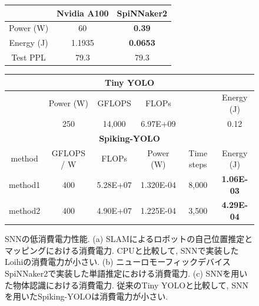 \begin{figure}[htb]
    \centering

    \begin{minipage}{0.3\textwidth}
        \centering
        
        \label{fig:snnslam}
    \end{minipage}
    \hspace{0.02\textwidth}
    \begin{minipage}{0.6\textwidth}
        \centering
        \begin{tabular}{ccc}
            \hline
            & Nvidia A100 & SpiNNaker2 \\ 
            \hline
            Power (W) & 60 & \textbf{0.39} \\
            Energy (J) & 1.1935 & \textbf{0.0653} \\
            Test PPL & 79.3 & 79.3 \\
            \hline
        \end{tabular}
        \label{tab:spinnaker}
    \end{minipage}


    \begin{minipage}{1.0\textwidth}
        \centering
        \begin{tabular}{cccccc}
            \hline
            \multicolumn{6}{c}{\textbf{Tiny YOLO}}\\
            \hline
            &Power (W) & GFLOPS & FLOPs & & Energy (J) \\
            &250 & 14,000 & 6.97E+09 & & 0.12 \\
            \hline
            \multicolumn{6}{c}{\textbf{Spiking-YOLO}}\\
            \hline
            method & GFLOPS / W & FLOPs & Power (W) & Time steps & Energy (J) \\
            method1 & 400 & 5.28E+07 & 1.320E-04 & 8,000 & \textbf{1.06E-03} \\
            method2 & 400 & 4.90E+07 & 1.225E-04 & 3,500 & \textbf{4.29E-04} \\
            \hline
        \end{tabular}
        \label{tab:snnyolo}
    \end{minipage}

    \caption[SNNの低消費電力性能]{
        SNNの低消費電力性能.
        (a) SLAMによるロボットの自己位置推定とマッピングにおける消費電力. 
        CPUと比較して, SNNで実装したLoihiの消費電力が小さい.
        (b) ニューロモーフィックデバイスSpiNNaker2で実装した単語推定における消費電力. 
        (c) SNNを用いた物体認識における消費電力. 従来のTiny YOLOと比較して, SNNを用いたSpiking-YOLOは消費電力が小さい.
    }
\end{figure}



